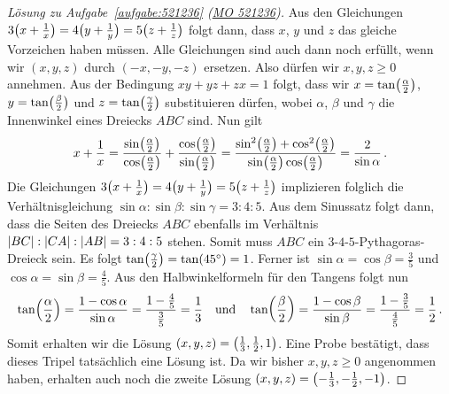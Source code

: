\begin{proof}[Lösung zu Aufgabe~\ref{aufgabe:521236} \textmd{(\href{https://www.mathematik-olympiaden.de/moev/index.php?option=com_download&thema=a&datei=A52123b.pdf&format=raw}{MO 521236})}]
	Aus den Gleichungen $3\parens[\big]{x+\frac1x}=4\parens[\big]{y+\frac1y}=5\parens[\big]{z+\frac1z}$ folgt dann, dass $x$, $y$ und $z$ das gleiche Vorzeichen haben müssen. Alle Gleichungen sind auch dann noch erfüllt, wenn wir $(x,y,z)$ durch $(-x,-y,-z)$ ersetzen. Also dürfen wir $x,y,z\geqslant 0$ annehmen. Aus der Bedingung $xy+yz+zx=1$ folgt, dass wir $x=\tan\parens[\big]{\frac{\alpha}2}$, $y=\tan\parens[\big]{\frac{\beta}2}$ und $z=\tan\parens[\big]{\frac{\gamma}2}$ substituieren dürfen, wobei $\alpha$, $\beta$ und $\gamma$ die Innenwinkel eines Dreiecks $ABC$ sind. Nun gilt
	\begin{equation*}
		x+\frac 1x=\frac{\sin \parens[\big]{\frac{\alpha}2}}{\cos\parens[\big]{\frac{\alpha}2}}+\frac{\cos\parens[\big]{\frac{\alpha}2}}{\sin\parens[\big]{\frac{\alpha}2}}=\frac{\sin^2\parens[\big]{\frac{\alpha}2}+\cos^2\parens[\big]{\frac{\alpha}2}}{\sin \parens[\big]{\frac{\alpha}2}\cos\parens[\big]{\frac{\alpha}2}}=\frac2{\sin\alpha}\,.
	\end{equation*}
	Die Gleichungen $3\parens[\big]{x+\frac1x}=4\parens[\big]{y+\frac1y}=5\parens[\big]{z+\frac1z}$ implizieren folglich die Verhältnisgleichung $\sin\alpha:\sin\beta:\sin\gamma=3:4:5$. Aus dem Sinussatz folgt dann, dass die Seiten des Dreiecks $ABC$ ebenfalls im Verhältnis $\abs*{BC}:\abs*{CA}:\abs*{AB}=3:4:5$ stehen. Somit muss $ABC$ ein $3$-$4$-$5$-Pythagoras-Dreieck sein. Es folgt $\tan \parens[\big]{\frac{\gamma}2}=\tan(45^\circ)=1$. Ferner ist $\sin\alpha=\cos\beta=\frac 35$ und $\cos\alpha=\sin\beta=\frac 45$. Aus den Halbwinkelformeln für den Tangens folgt nun
	\begin{equation*}
		\tan \parens*{\frac{\alpha}2}=\frac{1-\cos\alpha}{\sin\alpha}=\frac{1-\frac{4}{5}}{\frac{3}{5}}=\frac13\quad \text{und}\quad \tan \parens*{\frac{\beta}2}=\frac{1-\cos\beta}{\sin\beta}=\frac{1-\frac{3}{5}}{\frac{4}{5}}=\frac12\,.
	\end{equation*}
	Somit erhalten wir die Lösung $(x,y,z)=\parens[\big]{\frac13,\frac12,1}$. Eine Probe bestätigt, dass dieses Tripel tatsächlich eine Lösung ist. Da wir bisher $x,y,z\geqslant 0$ angenommen haben, erhalten auch noch die zweite Lösung $(x,y,z)=\parens[\big]{-\frac13,-\frac12,-1}$.
\end{proof}

